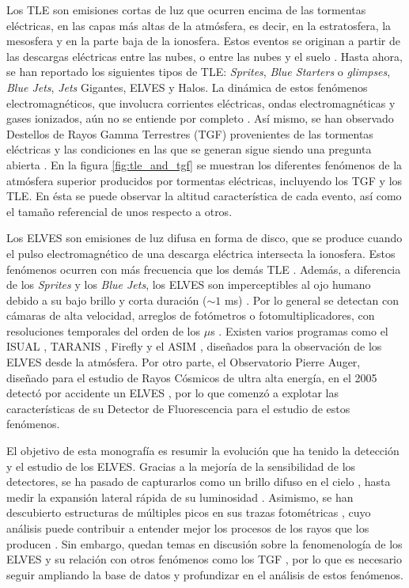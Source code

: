 \documentclass[11pt,oneside,openany,letter]{book}
\begin{document}
Los TLE son emisiones cortas de luz que ocurren encima de las tormentas eléctricas, en las capas más altas de la atmósfera, es decir, en la estratosfera, la mesosfera y en la parte baja de la ionosfera. Estos eventos se originan a partir de las descargas eléctricas entre las nubes, o entre las nubes y el suelo \cite{DwyerUman2014}. Hasta ahora, se han reportado los siguientes tipos de TLE: \textit{Sprites}, \textit{Blue Starters} o \textit{glimpses}, \textit{Blue Jets}, \textit{Jets} Gigantes, ELVES y Halos. La dinámica de estos fenómenos electromagnéticos, que involucra corrientes eléctricas, ondas electromagnéticas y gases ionizados, aún no se entiende por completo \cite{DwyerUman2014}. As\'i mismo, se han observado Destellos de Rayos Gamma Terrestres (TGF) provenientes de las tormentas eléctricas y las condiciones en las que se generan sigue siendo una pregunta abierta \cite{neubertEtal2020}. En la figura \ref{fig:tle_and_tgf} se muestran los diferentes fenómenos de la atmósfera superior producidos por tormentas eléctricas, incluyendo los TGF y los TLE. En ésta se puede observar la altitud característica de cada evento, así como el tamaño referencial de unos respecto a otros. 

Los ELVES son emisiones de luz difusa en forma de disco, que se produce cuando el pulso electromagn\'etico de una descarga el\'ectrica intersecta la ionosfera. Estos fen\'omenos ocurren con m\'as frecuencia que los dem\'as TLE \cite{chen2008}. Adem\'as, a diferencia de los \textit{Sprites} y los \textit{Blue Jets}, los ELVES son imperceptibles al ojo humano debido a su bajo brillo y corta duraci\'on ($\sim 1$ ms) \cite{FullekrugEtal2006}. Por lo general se detectan con c\'amaras de alta velocidad, arreglos de fot\'ometros o fotomultiplicadores, con resoluciones temporales del orden de los $\mu$s \cite{MussaCiaccio2012}. Existen varios programas como el ISUAL \cite{chen2008}, TARANIS \cite{lefeuvre2008taranis}, Firefly \cite{rowland2011nsf} y el ASIM \cite{neubertEtal2019}, diseñados para la observación de los ELVES desde la atm\'osfera. Por otro parte, el Observatorio Pierre Auger, diseñado para el estudio de Rayos Cósmicos de ultra alta energía, en el 2005 detectó por accidente un ELVES \cite{MussaCiaccio2012}, por lo que comenz\'o a explotar las caracter\'isticas de su Detector de Fluorescencia para el estudio de estos fenómenos. 

El objetivo de esta monografía es resumir la evolución que ha tenido la detección y el estudio de los ELVES. Gracias a la mejoría de la sensibilidad de los detectores, se ha pasado de capturarlos como un brillo difuso en el cielo \cite{BoeckEtal1992, Lyons1994A}, hasta medir la expansión lateral rápida de su luminosidad \cite{InanEtal1997}. Asimismo, se han descubierto estructuras de múltiples picos en sus trazas fotométricas \cite{Newsome2010, Mussa2019, aab2020}, cuyo análisis puede contribuir a entender mejor los procesos de los rayos que los producen \cite{Marshall2014, Da2015}. Sin embargo, quedan temas en discusión sobre la fenomenología de los ELVES y su relación con otros fenómenos como los TGF \cite{Liu2017, neubertEtal2020}, por lo que es necesario seguir ampliando la base de datos y profundizar en el análisis de estos fenómenos. 
\end{document}
